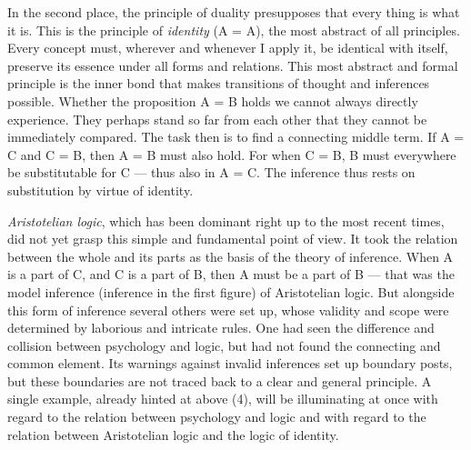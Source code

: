 \documentclass[12pt,a4paper]{book}
\newcommand{\opage}[1]{\marginnote{\footnotesize\textit{[#1]}}}
\begin{document}
In the second place, the principle of duality presupposes that every
thing is what it is. This is the principle of \emph{identity} (A = A),
the most abstract of all principles. Every concept must, wherever and
whenever I apply it, be identical with itself, preserve its essence
under all forms and relations. This most abstract and formal principle
is the inner bond that makes transitions of thought and inferences
possible. Whether the proposition A = B holds we cannot always directly
experience. They perhaps stand so far from each other that they cannot
be immediately compared. The task then is to find a connecting middle
term. If A = C and C = B, then A = B must also hold. For when C = B, B
must everywhere be substitutable for C --- thus also in A = C. The
inference thus rests on substitution by virtue of identity.

\emph{Aristotelian logic}, which has been dominant right up to the most
recent times, did not yet grasp this simple and fundamental point of
view. It took the relation between the whole and its parts as the basis
of the theory of inference. When A is a part of C, and C is a part of B,
then A must be a part of B --- that was the model inference (inference
in the first figure) of Aristotelian logic. But alongside this form of
inference several others were set up, whose validity and
\opage{217}scope were determined by laborious and intricate rules. One
had seen the difference and collision between psychology and logic, but
had not found the connecting and common element. Its warnings against
invalid inferences set up boundary posts, but these boundaries are not
traced back to a clear and general principle. A single example, already
hinted at above (4), will be illuminating at once with regard to the
relation between psychology and logic and with regard to the relation
between Aristotelian logic and the logic of identity.
\end{document}
